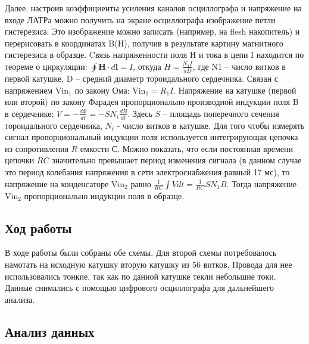\documentclass[a4paper,14pt]{extarticle}
\begin{document}
			Далее, настроив коэффициенты усиления каналов осциллографа и напряжение на входе ЛАТРа можно получить на экране осциллографа изображение петли гистерезиса. Это изображение можно записать (например, на flesh накопитель) и перерисовать в координатах B(H), получив в результате картину магнитного гистерезиса в образце. Cвязь напряженности поля H и тока в цепи I находится по теореме о циркуляции: $\oint\limits\mathbf{H}\cdot d\mathbf{l} = I$, откуда $H = \frac{N_1 I}{\pi D}$, где N1 – число витков в первой катушке, D – средний диаметр тороидального сердечника.
			Связан с напряжением $\text{Vin}_1$ по закону Ома: $\text{Vin}_1 = R_1 I$. Напряжение на катушке (первой или второй) по закону Фарадея пропорционально производной индукции поля B в сердечнике: $V = -\frac{d\Phi}{dt} = -SN_i\frac{dB}{dt}$. Здесь $S$ – площадь поперечного сечения тороидального сердечника, $N_i$ - число витков в катушке. Для того чтобы	измерять сигнал пропорциональный индукции поля используется интегрирующая цепочка из сопротивления $R$ емкости $С$. Можно показать, что если постоянная времени цепочки $RC$ значительно превышает период изменения сигнала (в данном случае это период колебания напряжения в сети электроснабжения равный 17 мс), то напряжение на конденсаторе $\text{Vin}_2$	равно $\frac{1}{RC}\int V dt = \frac{1}{RC}S N_1 B$. Тогда напряжение $\text{Vin}_2$ пропорционально индукции поля в образце.
		\subsection{Ход работы}
			В ходе работы были собраны обе схемы. Для второй схемы потребовалось намотать на исходную катушку вторую катушку из 56 витков. Провода для нее использовались тонкие, так как по данной катушке текли небольшие токи. Данные снимались с помощью цифрового осциллографа для дальнейшего анализа.
		\subsection{Анализ данных}
\end{document}
